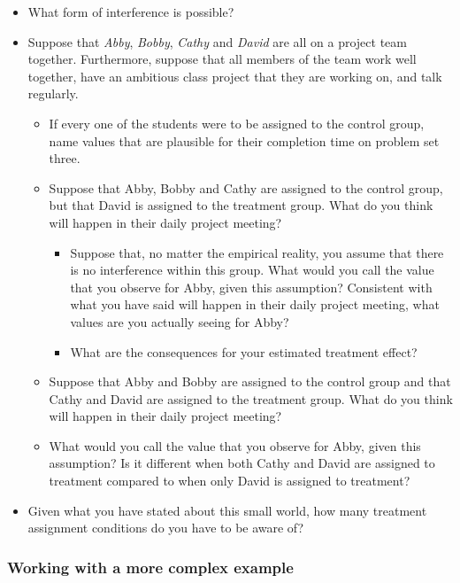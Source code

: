 \documentclass[
]{article}
\providecommand{\tightlist}{%
  \setlength{\itemsep}{0pt}\setlength{\parskip}{0pt}}
\begin{document}
\begin{itemize}
\tightlist
\item
  What form of interference is possible?
\item
  Suppose that \emph{Abby}, \emph{Bobby}, \emph{Cathy} and \emph{David} are all on a project team together. Furthermore, suppose that all members of the team work well together, have an ambitious class project that they are working on, and talk regularly.

  \begin{itemize}
  \tightlist
  \item
    If every one of the students were to be assigned to the control group, name values that are plausible for their completion time on problem set three.
  \item
    Suppose that Abby, Bobby and Cathy are assigned to the control group, but that David is assigned to the treatment group. What do you think will happen in their daily project meeting?

    \begin{itemize}
    \tightlist
    \item
      Suppose that, no matter the empirical reality, you assume that there is no interference within this group. What would you call the value that you observe for Abby, given this assumption? Consistent with what you have said will happen in their daily project meeting, what values are you actually seeing for Abby?
    \item
      What are the consequences for your estimated treatment effect?
    \end{itemize}
  \item
    Suppose that Abby and Bobby are assigned to the control group and that Cathy and David are assigned to the treatment group. What do you think will happen in their daily project meeting?
  \item
    What would you call the value that you observe for Abby, given this assumption? Is it different when both Cathy and David are assigned to treatment compared to when only David is assigned to treatment?
  \end{itemize}
\item
  Given what you have stated about this small world, how many treatment assignment conditions do you have to be aware of?
\end{itemize}

\hypertarget{working-with-a-more-complex-example}{%
\subsubsection{Working with a more complex example}\label{working-with-a-more-complex-example}}
\end{document}
